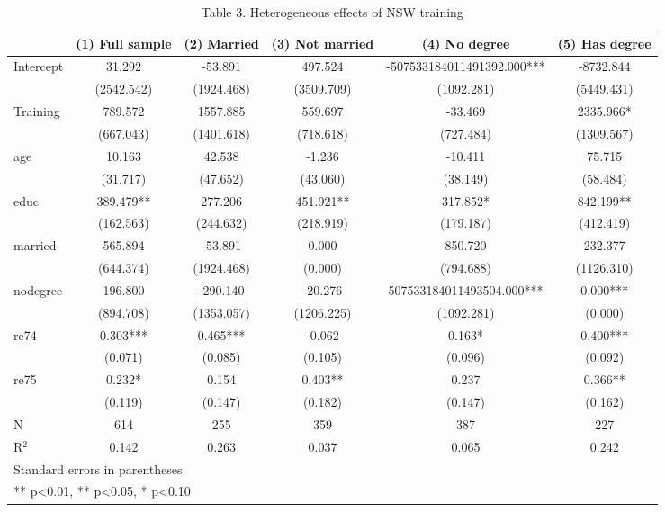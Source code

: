 \begin{table}[htbp]
\centering
\caption{Table 3. Heterogeneous effects of NSW training}
\begin{tabular}{lccccc}
\hline\hline
 & (1) Full sample & (2) Married & (3) Not married & (4) No degree & (5) Has degree \\
\hline
Intercept & 31.292 & -53.891 & 497.524 & -507533184011491392.000*** & -8732.844 \\
 & (2542.542) & (1924.468) & (3509.709) & (1092.281) & (5449.431) \\
Training & 789.572 & 1557.885 & 559.697 & -33.469 & 2335.966* \\
 & (667.043) & (1401.618) & (718.618) & (727.484) & (1309.567) \\
age & 10.163 & 42.538 & -1.236 & -10.411 & 75.715 \\
 & (31.717) & (47.652) & (43.060) & (38.149) & (58.484) \\
educ & 389.479** & 277.206 & 451.921** & 317.852* & 842.199** \\
 & (162.563) & (244.632) & (218.919) & (179.187) & (412.419) \\
married & 565.894 & -53.891 & 0.000 & 850.720 & 232.377 \\
 & (644.374) & (1924.468) & (0.000) & (794.688) & (1126.310) \\
nodegree & 196.800 & -290.140 & -20.276 & 507533184011493504.000*** & 0.000*** \\
 & (894.708) & (1353.057) & (1206.225) & (1092.281) & (0.000) \\
re74 & 0.303*** & 0.465*** & -0.062 & 0.163* & 0.400*** \\
 & (0.071) & (0.085) & (0.105) & (0.096) & (0.092) \\
re75 & 0.232* & 0.154 & 0.403** & 0.237 & 0.366** \\
 & (0.119) & (0.147) & (0.182) & (0.147) & (0.162) \\
\hline
N & 614 & 255 & 359 & 387 & 227 \\
R$^2$ & 0.142 & 0.263 & 0.037 & 0.065 & 0.242 \\
\hline\hline
\multicolumn{6}{l}{\footnotesize Standard errors in parentheses} \\
\multicolumn{6}{l}{\footnotesize *** p<0.01, ** p<0.05, * p<0.10} \\
\end{tabular}
\end{table}